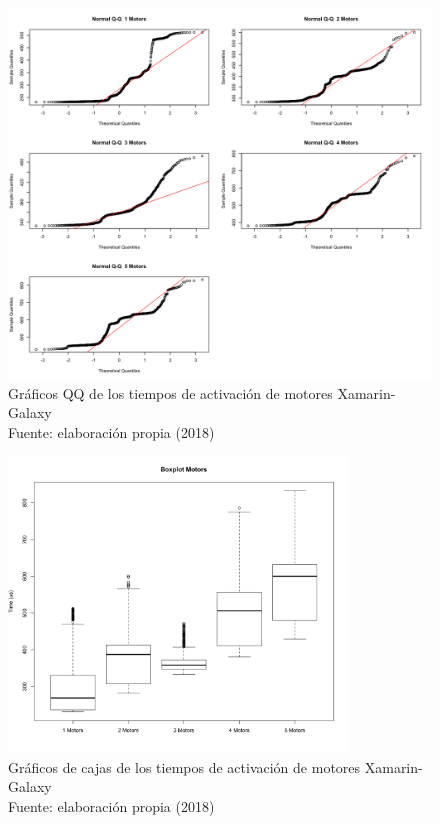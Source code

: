 \begin{figure}[H]
  \begin{center} 
   	\includegraphics[width=1.0\textwidth]{evaluation/graphics/Xamarin/Galaxy/NormalQQMotorsXamarinGalaxy.png} 
   	\captionsetup{justification=centering}
    \caption[Gráfico QQ de los tiempos de activación de motores Xamarin-Galaxy]{Gráficos QQ de los tiempos de activación de motores Xamarin-Galaxy\\Fuente: elaboración propia (2018)} 
    \label{fig:xamarin-galaxy-QQ-motors}
  \end{center}
\end{figure}

\begin{figure}[H]
  \begin{center} 
   	\includegraphics[width=0.8\textwidth]{evaluation/graphics/Xamarin/Galaxy/BoxplotMotorsXamarinGalaxy.png} 
   	\captionsetup{justification=centering}
    \caption[Gráficos de cajas de los tiempos de activación de motores Xamarin-Galaxy]{Gráficos de cajas de  los tiempos de activación de motores Xamarin-Galaxy\\Fuente: elaboración propia (2018)} 
    \label{fig:xamarin-galaxy-boxplot-motors}
  \end{center}
\end{figure}

